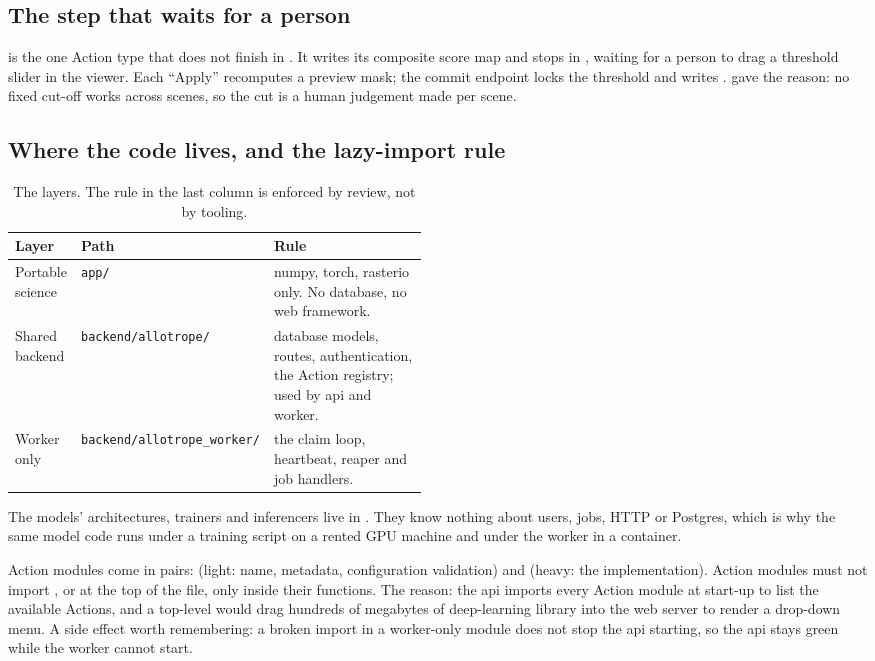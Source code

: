 \subsection{The step that waits for a person}

 is the one Action type that does not finish in . It
writes its composite score map and stops in , waiting for a person to drag a
threshold slider in the viewer. Each ``Apply'' recomputes a preview mask; the commit endpoint locks
the threshold and writes .  gave the reason:
no fixed cut-off works across scenes, so the cut is a human judgement made per scene.

\subsection{Where the code lives, and the lazy-import rule}

\begin{table}[htbp]\centering
\caption{The layers. The rule in the last column is enforced by review, not by tooling.}\label{tab:product:layers}
\small
\begin{tabular}{@{}llp{0.48\linewidth}@{}}\toprule
Layer & Path & Rule\\\midrule
Portable science & \texttt{app/} & numpy, torch, rasterio only. No database, no web framework.\\
Shared backend & \texttt{backend/allotrope/} & database models, routes, authentication, the Action registry; used by api and worker.\\
Worker only & \texttt{backend/allotrope\_worker/} & the claim loop, heartbeat, reaper and job handlers.\\\bottomrule
\end{tabular}
\end{table}

The models' architectures, trainers and inferencers live in . They know nothing about
users, jobs, HTTP or Postgres, which is why the same model code runs under a training script on a
rented GPU machine and under the worker in a container.

Action modules come in pairs:  (light: name, metadata, configuration
validation) and  (heavy: the implementation). Action modules must not
import ,  or  at the top of the file, only inside their
functions. The reason: the api imports every Action module at start-up to list the available
Actions, and a top-level  would drag hundreds of megabytes of deep-learning
library into the web server to render a drop-down menu. A side effect worth remembering: a broken
import in a worker-only module does not stop the api starting, so the api stays green while the
worker cannot start.

